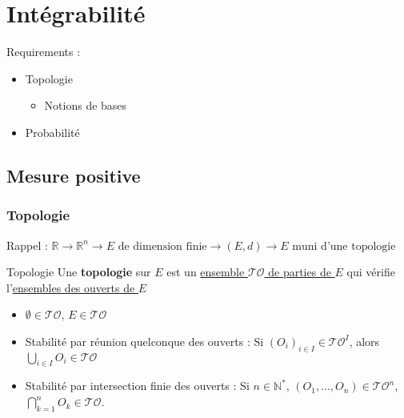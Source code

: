 
\chapter{Intégrabilité} %



\begin{tcolorbox}
Requirements : 
\begin{itemize}

    \item Topologie
      \begin{itemize}

      \item Notions de bases

      \end{itemize}

    \item Probabilité

\end{itemize}
\end{tcolorbox}

\label{chap:Intégrabilité}


\section{Mesure positive} %
\label{sec:Mesure positive}

\subsection{Topologie} %
\label{sub:Topologie}


Rappel : $\mathbb{R} \to \mathbb{R} ^{n} \to E \text{ de dimension finie} \to (E,d) \to E \text{ muni d'une topologie}$

\begin{Definition}[colbacktitle=red!75!black]{Topologie}{}
  Une \textbf{topologie} sur $E$ est un \underline{ensemble $\mathcal{TO}$ de parties de $E$} qui vérifie l'\underline{ensembles des ouverts de $E$}
  \begin{itemize}

      \item $\emptyset \in \mathcal{TO}$, $E \in \mathcal{TO}$ 
      \item Stabilité par réunion quelconque des ouverts : Si $(O_i) _{i \in I} \in \mathcal{TO} ^{I}$, alors $\bigcup _{i \in I} O_i \in \mathcal{TO}$ 
      \item Stabilité par intersection finie des ouverts : Si $n \in \mathbb{N} ^{*}$, $(O_1, \dots, O_n) \in \mathcal{TO} ^{n}$, $\bigcap _{k=1} ^{n} O_k \in \mathcal{TO}$.

  \end{itemize}
\end{Definition} 

